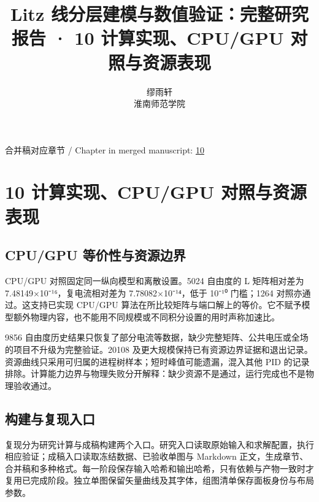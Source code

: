 \documentclass[11pt]{article}
\begin{document}
\title{Litz 线分层建模与数值验证：完整研究报告 · 10 计算实现、CPU/GPU 对照与资源表现}
\author{缪雨轩\\淮南师范学院}
\date{}
\maketitle
\noindent 合并稿对应章节 / Chapter in merged manuscript: \href{report_zh-CN_single.pdf#chapter-10}{10}\par
\FloatBarrier
\section*{10 计算实现、CPU/GPU 对照与资源表现}
\hypertarget{chapter-10}{}
\subsection*{CPU/GPU 等价性与资源边界}
\hypertarget{10.compute.heading}{}
CPU/GPU 对照固定同一纵向模型和离散设置。5024 自由度的 L 矩阵相对差为 7.48149×10⁻¹⁶，复电流相对差为 7.78082×10⁻¹⁴，低于 10⁻¹⁰ 门槛；1264 对照亦通过。这支持已实现 CPU/GPU 算法在所比较矩阵与端口解上的等价。它不赋予模型额外物理内容，也不能用不同规模或不同积分设置的用时声称加速比。


9856 自由度历史结果只恢复了部分电流等数据，缺少完整矩阵、公共电压或全场的项目不升级为完整验证。20108 及更大规模保持已有资源边界证据和退出记录。资源曲线只采用可归属的进程树样本；短时峰值可能遗漏，混入其他 PID 的记录排除。计算能力边界与物理失败分开解释：缺少资源不是通过，运行完成也不是物理验收通过。


\subsection*{构建与复现入口}
\hypertarget{10.workflow.heading}{}
复现分为研究计算与成稿构建两个入口。研究入口读取原始输入和求解配置，执行相应验证；成稿入口读取冻结数据、已验收单图与 Markdown 正文，生成章节、合并稿和多种格式。每一阶段保存输入哈希和输出哈希，只有依赖与产物一致时才复用已完成阶段。独立单图保留矢量曲线及其字体，组图清单保存面板身份与布局参数。
\end{document}
